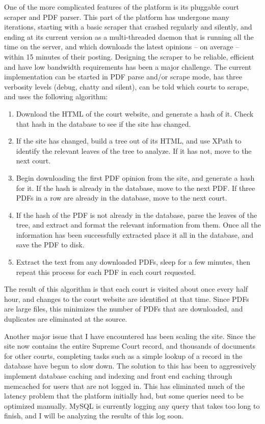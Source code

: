 One of the more complicated features of the platform is its pluggable court scraper and PDF parser. This part of the platform has undergone many iterations, starting with a basic scraper that crashed regularly and silently, and ending at its current version as a multi-threaded daemon that is running all the time on the server, and which downloads the latest opinions -- on average -- within 15 minutes of their posting. Designing the scraper to be reliable, efficient and have low bandwidth requirements has been a major challenge. The current implementation can be started in PDF parse and/or scrape mode, has three verbosity levels (debug, chatty and silent), can be told which courts to scrape, and uses the following algorithm:
\begin{enumerate}
    \item{Download the HTML of the court website, and generate a hash of it. Check that hash in the database to see if the site has changed.}
    \item{If the site has changed, build a tree out of its HTML, and use XPath to identify the relevant leaves of the tree to analyze. If it has not, move to the next court.}
    \item{Begin downloading the first PDF opinion from the site, and generate a hash for it. If the hash is already in the database, move to the next PDF. If three PDFs in a row are already in the database, move to the next court.}
    \item{If the hash of the PDF is not already in the database, parse the leaves of the tree, and extract and format the relevant information from them. Once all the information has been successfully extracted place it all in the database, and save the PDF to disk.}
    \item{Extract the text from any downloaded PDFs, sleep for a few minutes, then repeat this process for each PDF in each court requested.}
\end{enumerate}
The result of this algorithm is that each court is visited about once every half hour, and changes to the court website are identified at that time. Since PDFs are large files, this minimizes the number of PDFs that are downloaded, and duplicates are eliminated at the source.

Another major issue that I have encountered has been scaling the site. Since the site now contains the entire Supreme Court record, and thousands of documents for other courts, completing tasks such as a simple lookup of a record in the database have begun to slow down. The solution to this has been to aggressively implement database caching and indexing and front end caching through memcached for users that are not logged in. This has eliminated much of the latency problem that the platform initially had, but some queries need to be optimized manually. MySQL is currently logging any query that takes too long to finish, and I will be analyzing the results of this log soon.
